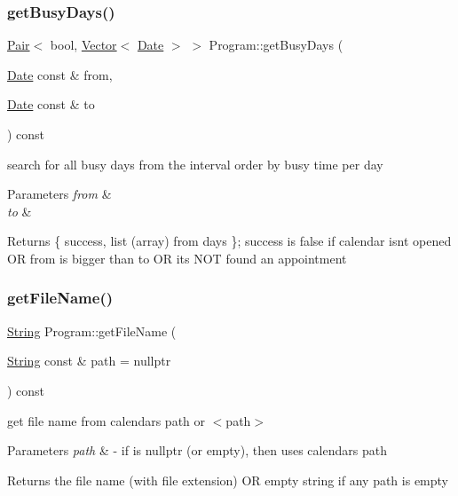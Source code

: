 \subsubsection{\texorpdfstring{get\+Busy\+Days()}{getBusyDays()}}
{\footnotesize\ttfamily \hyperlink{structPair}{Pair}$<$ bool, \hyperlink{classVector}{Vector}$<$ \hyperlink{classDate}{Date} $>$ $>$ Program\+::get\+Busy\+Days (\begin{DoxyParamCaption}\item[{\hyperlink{classDate}{Date} const \&}]{from,  }\item[{\hyperlink{classDate}{Date} const \&}]{to }\end{DoxyParamCaption}) const}

search for all busy days from the interval order by busy time per day 
\begin{DoxyParams}{Parameters}
{\em from} & \\
\hline
{\em to} & \\
\hline
\end{DoxyParams}
\begin{DoxyReturn}{Returns}
\{ success, list (array) from days \}; success is false if calendar isn\textquotesingle{}t opened OR from is bigger than to OR it\textquotesingle{}s N\+OT found an appointment 
\end{DoxyReturn}
\mbox{\label{classProgram_a78c686e8f768666e0377b23317134b4a}} 
\subsubsection{\texorpdfstring{get\+File\+Name()}{getFileName()}}
{\footnotesize\ttfamily \hyperlink{classString}{String} Program\+::get\+File\+Name (\begin{DoxyParamCaption}\item[{\hyperlink{classString}{String} const \&}]{path = {\ttfamily nullptr} }\end{DoxyParamCaption}) const}

get file name from calendar\textquotesingle{}s path or $<$path$>$ 
\begin{DoxyParams}{Parameters}
{\em path} & -\/ if is nullptr (or empty), then uses calendar\textquotesingle{}s path \\
\hline
\end{DoxyParams}
\begin{DoxyReturn}{Returns}
the file name (with file extension) OR empty string if any path is empty 
\end{DoxyReturn}
\mbox{\label{classProgram_ad14086e73ec4aef58c705e3a19089d97}} 
